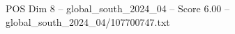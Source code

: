 \begin{textsample}{POS Dim 8 – global\_south\_2024\_04 – Score 6.00 – global\_south\_2024\_04/107700747.txt}
\end{textsample}

